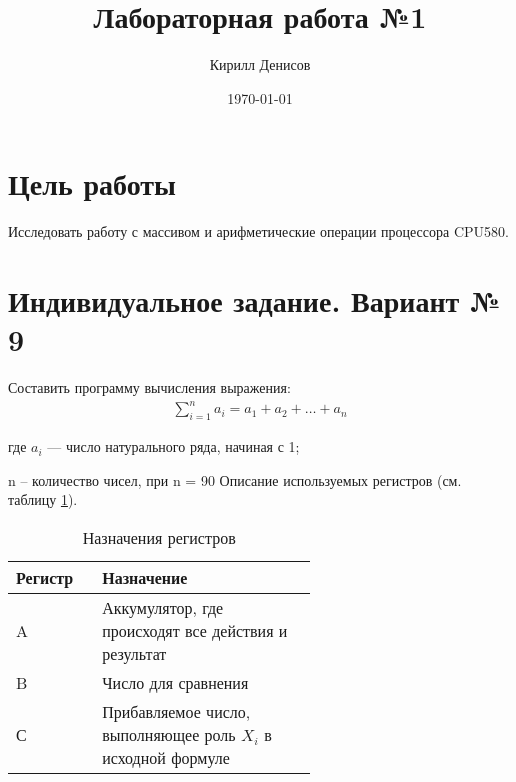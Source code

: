 \documentclass[a4paper,14pt]{extarticle}
\author{Кирилл Денисов}
\title{Лабораторная работа №1}
\date{\today}
\newcommand{\pathToCommonFolder}{/home/denilai/Documents/repos/latex/Common}
\begin{document}
	\thispagestyle{empty}
	
	\newpage
	
\section*{Цель работы}
Исследовать работу с массивом и арифметические операции процессора
CPU580.
\section*{Индивидуальное задание. Вариант № 9}
\begin{problem*}
	Составить программу вычисления выражения:
	\begin{align}
		\sum_{i=1}^{n}a_i=a_1+a_2+\dots+a_n
	\end{align}

где $a_i$ --- число натурального ряда, начиная с 1;

n – количество чисел, при n = 90
\nonum
Описание используемых регистров (см. таблицу \ref{tab:registers}).

\begin{table}[h!]
	\centering
	\caption{Назначения регистров}
	\begin{tabular}{|m{0.1\linewidth}|p{0.5\linewidth}|}
		\hline
		Регистр & Назначение \\ \hline
		A &  Аккумулятор, где происходят все действия и результат\\ \hline
		B & Число для сравнения\\ \hline
		С & Прибавляемое число,
		выполняющее роль $X_i$ в
		исходной формуле\\\hline
	\end{tabular}
\label{tab:registers}
\end{table}



\end{problem*}
\end{document}
